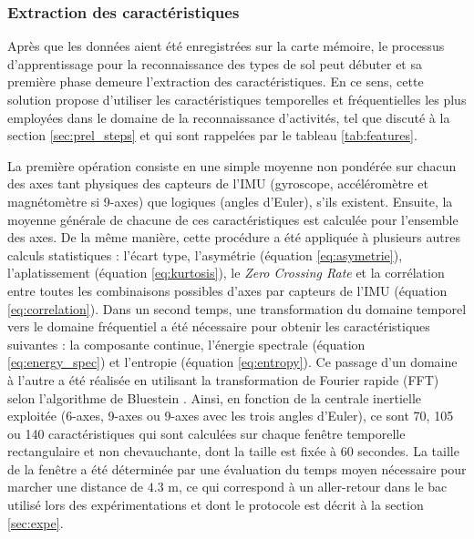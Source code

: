 \subsubsection{Extraction des caractéristiques}

Après que les données aient été enregistrées sur la carte mémoire, le processus d'apprentissage pour la reconnaissance des types de sol peut débuter et sa première phase demeure l'extraction des caractéristiques. En ce sens, cette solution propose d'utiliser les caractéristiques temporelles et fréquentielles les plus employées dans le domaine de la reconnaissance d'activités, tel que discuté à la section \ref{sec:prel_steps} et qui sont rappelées par le tableau \ref{tab:features}.

La première opération consiste en une simple moyenne non pondérée sur chacun des axes tant \og{}physiques\fg{} des capteurs de l'\acs{IMU} (gyroscope, accéléromètre et magnétomètre si 9-axes) que \og{}logiques\fg{} (angles d'Euler), s'ils existent. Ensuite, la moyenne générale de chacune de ces caractéristiques est calculée pour l'ensemble des axes. De la même manière, cette procédure a été appliquée à plusieurs autres calculs statistiques : l'écart type, l'asymétrie (équation \ref{eq:asymetrie}), l'aplatissement (équation \ref{eq:kurtosis}), le \textit{Zero Crossing Rate} et la corrélation entre toutes les combinaisons possibles d'axes par capteurs de l'\acs{IMU} (équation \ref{eq:correlation}). Dans un second temps, une transformation du domaine temporel vers le domaine fréquentiel a été nécessaire pour obtenir les caractéristiques suivantes : la composante continue, l'énergie spectrale (équation \ref{eq:energy_spec}) et l'entropie  (équation \ref{eq:entropy}). Ce passage d'un domaine à l'autre a été réalisée en utilisant la transformation de Fourier rapide (\acs{FFT}) selon l'algorithme de Bluestein \citep{Bluestein1970}. Ainsi, en fonction de la centrale inertielle exploitée (6-axes, 9-axes ou 9-axes avec les trois angles d'Euler), ce sont 70, 105 ou 140 caractéristiques qui sont calculées sur chaque fenêtre temporelle rectangulaire et non chevauchante, dont la taille est fixée à 60 secondes. La taille de la fenêtre a été déterminée par une évaluation du temps moyen nécessaire pour marcher une distance de $4.3$ m, ce qui correspond à un aller-retour dans le bac utilisé lors des expérimentations et dont le protocole est décrit à la section \ref{sec:expe}.

